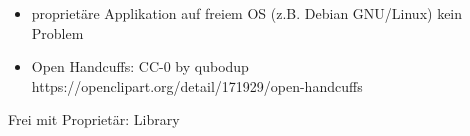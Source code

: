\note
{
	\begin{itemize}
		\item proprietäre Applikation auf freiem OS (z.B. Debian GNU/Linux) kein Problem
		\item Open Handcuffs: CC-0 by qubodup https://openclipart.org/detail/171929/open-handcuffs
	\end{itemize}
}

\begin{frame}{Frei mit Proprietär: Library}
	\begin{multicols}{2}
		\begin{center}
\end{center}
\end{multicols}
\end{frame}
